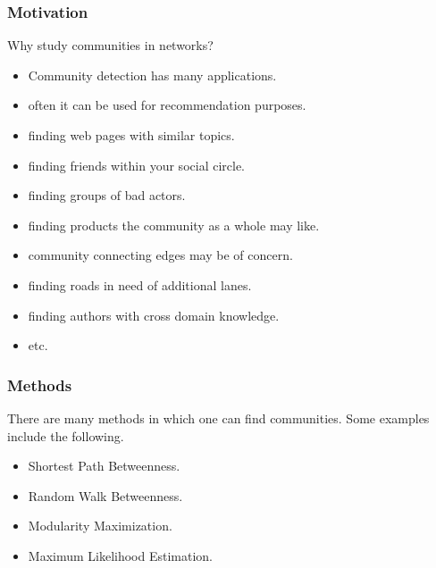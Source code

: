 \documentclass{beamer}
\begin{document}
\begin{frame}

    \frametitle{Motivation}

    Why study communities in networks?\pause

    \vspace{2.5mm}
    \begin{itemize}
        \item Community detection has many applications.\pause
        \item[$\diamond$] often it can be used for recommendation purposes.\pause
        \item[$\ast$] finding web pages with similar topics.\pause
        \item[$\ast$] finding friends within your social circle.\pause
        \item[$\ast$] finding groups of bad actors.\pause
        \item[$\ast$] finding products the community as a whole may like.\pause
        \item[$\diamond$] community connecting edges may be of concern.\pause
        \item[$\ast$] finding roads in need of additional lanes.\pause
        \item[$\ast$] finding authors with cross domain knowledge.\pause
        \item[$\diamond$] etc.
    \end{itemize}

\end{frame}


\begin{frame}

    \frametitle{Methods}

    There are many methods in which one can find communities. Some examples include the following.\pause

    \vspace{2.5mm}
    \begin{itemize}
        \item Shortest Path Betweenness.\pause
        \item Random Walk Betweenness.\pause
        \item Modularity Maximization.\pause
        \item Maximum Likelihood Estimation.
    \end{itemize}

\end{frame}
\end{document}
